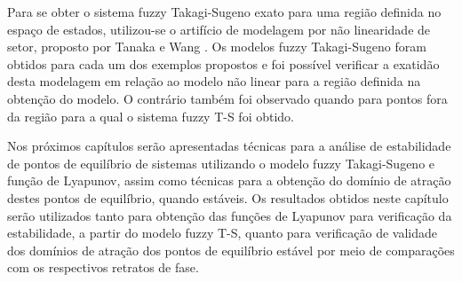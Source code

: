 Para se obter o sistema fuzzy Takagi-Sugeno exato para uma região definida no espaço de estados, utilizou-se o artifício de modelagem por não linearidade de setor, proposto por Tanaka e Wang \cite{booktw:2003}. Os modelos fuzzy Takagi-Sugeno foram obtidos para cada um dos exemplos propostos e foi possível verificar a exatidão desta modelagem em relação ao modelo não linear para a região definida na obtenção do modelo. O contrário também foi observado quando para pontos fora da região para a qual o sistema fuzzy T-S foi obtido.

Nos próximos capítulos serão apresentadas técnicas para a análise de estabilidade de pontos de equilíbrio de sistemas utilizando o modelo fuzzy Takagi-Sugeno e função de Lyapunov, assim como técnicas para a obtenção do domínio de atração destes pontos de equilíbrio, quando estáveis. Os resultados obtidos neste capítulo serão utilizados tanto para obtenção das funções de Lyapunov para verificação da estabilidade, a partir do modelo fuzzy T-S, quanto para verificação de validade dos domínios de atração dos pontos de equilíbrio estável por meio de comparações com os respectivos retratos de fase.